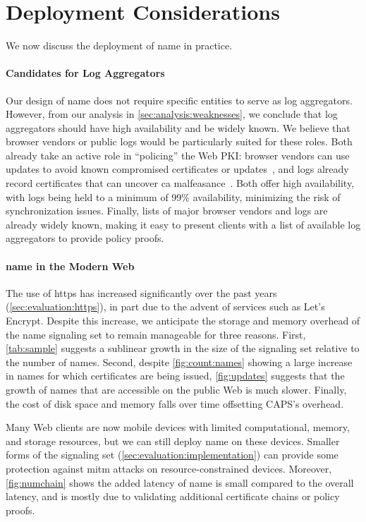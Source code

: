 \section{Deployment Considerations}
\label{sec:discussion}

We now discuss the deployment of \ac{name} in practice. 

\paragraph{Candidates for Log Aggregators}
Our design of \ac{name} does not require specific entities to serve as log
aggregators. However, from our analysis in \autoref{sec:analysis:weaknesses},
we conclude that log aggregators should have high availability and be widely
known. We believe that browser vendors or public logs would be particularly
suited for these roles. Both already take an active role in ``policing'' the
Web PKI: browser vendors can use updates to avoid known compromised
certificates or updates~\cite{langley2012revocation}, and logs already record
certificates that can uncover \ac{ca} malfeasance~\cite{sleevi2015sustaining}.
Both offer high availability, with logs being held to a minimum of 99\%
availability, minimizing the risk of synchronization issues. Finally, lists
of major browser vendors and logs are already widely known, making it easy to
present clients with a list of available log aggregators to provide policy
proofs.

\paragraph{\ac{name} in the Modern Web}
The use of \ac{https} has increased significantly over the past years
(\autoref{sec:evaluation:https}), in part due to the advent of services such as
Let's Encrypt. Despite this increase, we anticipate the 
storage and memory overhead of the \ac{name} signaling set to remain manageable for
three reasons. First, \autoref{tab:sample} suggests a sublinear growth in the
size of the signaling set relative to the number of names. Second, despite
\autoref{fig:count:names} showing a large increase in names for which
certificates are being issued, \autoref{fig:updates} suggests that the growth
of names that are accessible on the public Web is much slower. Finally, the
cost of disk space and memory falls over time offsetting CAPS's overhead.

Many Web clients are now mobile devices with limited
computational, memory, and storage resources, but we can still deploy
\ac{name} on these devices. 
Smaller forms of the signaling set (\autoref{sec:evaluation:implementation}) can
provide some protection against \ac{mitm} attacks on resource-constrained
devices. Moreover, \autoref{fig:numchain} shows the added latency of \ac{name}
is small compared to the overall latency, and is mostly due to validating
additional certificate chains or policy proofs.
